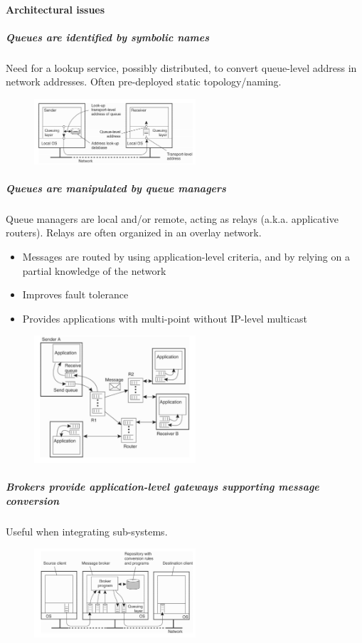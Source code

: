 \documentclass[10pt,a4paper]{article}
\begin{document}
\paragraph{Architectural issues}
\subparagraph*{Queues are identified by symbolic names}
Need for a lookup service, possibly distributed, to convert queue-level address in network addresses. Often pre-deployed static topology/naming.
 \begin{figure}[h!]
 \hfill \includegraphics[width=170pt]{images/m-ai1.png}\hspace*{\fill}
  \label{fig:m-ai1}
\end{figure}
\subparagraph{Queues are manipulated by queue managers}
Queue managers are local and/or remote, acting as relays (a.k.a. applicative routers). Relays are often organized in an overlay network. 
\begin{itemize}
	\item Messages are routed by using application-level criteria, and by relying on a partial knowledge of the network
	\item Improves fault tolerance
	\item Provides applications with multi-point without IP-level multicast
\end{itemize}
 \begin{figure}[h!]
 \hfill \includegraphics[width=170pt]{images/m-ai2.png}\hspace*{\fill}
  \label{fig:m-ai2}
\end{figure}
\subparagraph{Brokers provide application-level gateways supporting message conversion}
Useful when integrating sub-systems.
 \begin{figure}[h!]
 \hfill \includegraphics[width=170pt]{images/m-ai3.png}\hspace*{\fill}
  \label{fig:m-ai3}
\end{figure}
\end{document}
